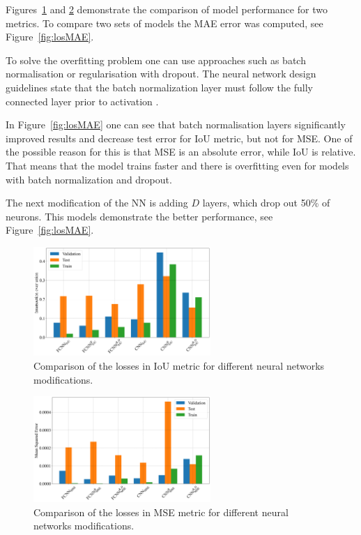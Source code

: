 \documentclass[aerospace,article,submit,moreauthors,pdftex]{Definitions/mdpi}
\begin{document}
Figures~\ref{fig:losIoU} and \ref{fig:losMSE} demonstrate the comparison of model performance for two metrics. To compare two sets of models the MAE error was computed, see Figure~\ref{fig:losMAE}.

To solve the overfitting problem one can use approaches such as batch normalisation or regularisation with dropout. The neural network design guidelines state that the batch normalization layer must follow the fully connected layer prior to activation \cite{ioffe2015batch}. 

In Figure~\ref{fig:losMAE} one can see that batch normalisation layers significantly improved results and decrease test error for IoU metric, but not for MSE. One of the possible reason for this is that MSE is an absolute error, while IoU is relative. That means that the model trains faster and there is overfitting even for models with batch normalization and dropout. 

The next modification of the NN is adding $D$ layers, which drop out 50\% of neurons. This models demonstrate the better performance, see Figure~\ref{fig:losMAE}.

\begin{figure}[H]
\includegraphics[width=0.6\textwidth]{Figures/losIoU.png}
\caption{Comparison of the losses in IoU metric for different neural networks modifications.\label{fig:losIoU}}
\end{figure} 

\begin{figure}[H]
\includegraphics[width=0.6\textwidth]{Figures/losMSE.png}
\caption{Comparison of the losses in MSE metric for different neural networks modifications.\label{fig:losMSE}}
\end{figure} 
\end{document}
